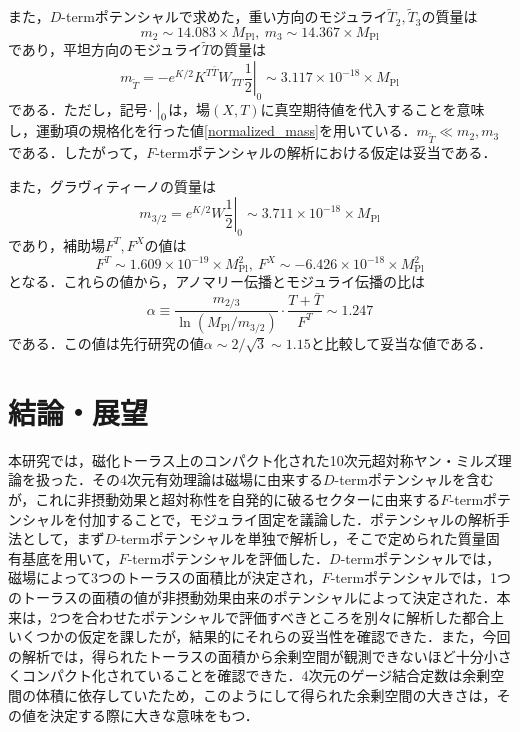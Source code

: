 \documentclass[a4paper,uplatex,dvipdfmx,10pt]{jsarticle}
\theoremstyle{definition}
\begin{document}
また，$D$-termポテンシャルで求めた，重い方向のモジュライ$\tilde{T}_{2},\tilde{T}_{3}$の質量は
\begin{equation}
   m_{2}
   \sim
   14.083
   \times
   M_{\text{Pl}}
   ,\ 
   m_{3}
   \sim
   14.367
   \times
   M_{\text{Pl}}
   \nonumber
\end{equation}
であり，平坦方向のモジュライ$\tilde{T}$の質量は
\begin{equation}
   m_{\tilde{T}}
   =
   -e^{K/2}K^{T\bar{T}}W_{TT}
   \left.\frac{1}{2}\right|_{0}
   \sim
   3.117
   \times
   10^{-18}
   \times
   M_{\text{Pl}}
   \nonumber
\end{equation}
である．ただし，記号$\cdot\left.\vphantom{\frac{1}{2}}\right|_{0}$は，場$(X,T)$に真空期待値を代入することを意味し，運動項の規格化を行った値\eqref{normalized_mass}を用いている．$m_{\tilde{T}}\ll m_{2}, m_{3}$である．したがって，$F$-termポテンシャルの解析における仮定は妥当である．

また，グラヴィティーノの質量は
\begin{equation}
   m_{3/2}
   =
   e^{K/2}W
   \left.\frac{1}{2}\right|_{0}
   \sim
   3.711\times 10^{-18}
   \times
   M_{\text{Pl}}
   \nonumber
\end{equation}
であり，補助場$F^{T},F^{X}$の値は
\begin{equation}
   F^{T}
   \sim
   1.609\times 10^{-19}
   \times
   M_{\text{Pl}}^2
   ,\ 
   F^{X}
   \sim
   -6.426\times 10^{-18}
   \times
   M_{\text{Pl}}^2
   \nonumber
\end{equation}
となる．これらの値から，アノマリー伝播とモジュライ伝播の比\cite{Choi_PhenomenologyMixed_2005}は
\begin{equation}
   \alpha
   \equiv
   \frac{m_{2/3}}{\ln(M_{\text{Pl}}/m_{3/2})}
   \cdot
   \frac{T+\bar{T}}{F^{T}}
   \sim
   1.247
   \nonumber
\end{equation}
である．この値は先行研究\cite{Abe_ModuliStabilization_2007a}の値$\alpha\sim 2/\sqrt{3}\sim 1.15$と比較して妥当な値である．


\section{結論・展望}

本研究では，磁化トーラス上のコンパクト化された10次元超対称ヤン・ミルズ理論を扱った．その4次元有効理論は磁場に由来する$D$-termポテンシャルを含むが，これに非摂動効果と超対称性を自発的に破るセクターに由来する$F$-termポテンシャルを付加することで，モジュライ固定を議論した．ポテンシャルの解析手法として，まず$D$-termポテンシャルを単独で解析し，そこで定められた質量固有基底を用いて，$F$-termポテンシャルを評価した．$D$-termポテンシャルでは，磁場によって3つのトーラスの面積比が決定され，$F$-termポテンシャルでは，1つのトーラスの面積の値が非摂動効果由来のポテンシャルによって決定された．本来は，2つを合わせたポテンシャルで評価すべきところを別々に解析した都合上いくつかの仮定を課したが，結果的にそれらの妥当性を確認できた．また，今回の解析では，得られたトーラスの面積から余剰空間が観測できないほど十分小さくコンパクト化されていることを確認できた．4次元のゲージ結合定数は余剰空間の体積に依存していたため，このようにして得られた余剰空間の大きさは，その値を決定する際に大きな意味をもつ．
\end{document}
